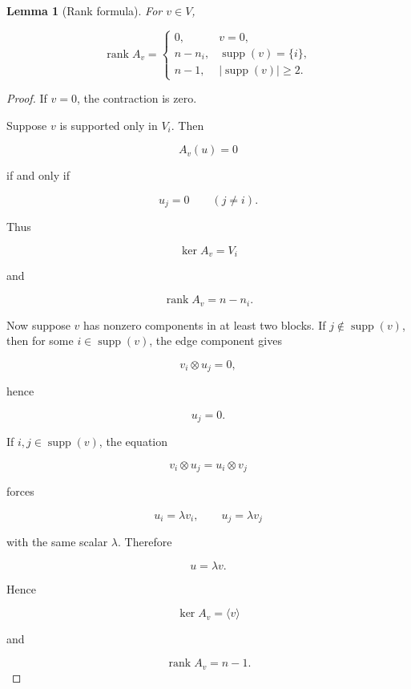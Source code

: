 \documentclass[11pt]{article}
\newtheorem{lemma}[theorem]{Lemma}
\begin{document}
\begin{lemma}[Rank formula]

For $v\in V$,

\[
\operatorname{rank}A_v=
\begin{cases}
0,&v=0,\\
n-n_i,&\operatorname{supp}(v)=\{i\},\\
n-1,&|\operatorname{supp}(v)|\ge2.
\end{cases}
\]

\end{lemma}
\begin{proof}

If $v=0$, the contraction is zero.

Suppose $v$ is supported only in $V_i$. Then

\[
A_v(u)=0
\]

if and only if

\[
u_j=0
\qquad
(j\ne i).
\]

Thus

\[
\ker A_v=V_i
\]

and

\[
\operatorname{rank}A_v=n-n_i.
\]

Now suppose $v$ has nonzero components in at least two blocks. If $j\notin\operatorname{supp}(v)$, then for some $i\in\operatorname{supp}(v)$, the edge component gives

\[
v_i\otimes u_j=0,
\]

hence

\[
u_j=0.
\]

If $i,j\in\operatorname{supp}(v)$, the equation

\[
v_i\otimes u_j=u_i\otimes v_j
\]

forces

\[
u_i=\lambda v_i,
\qquad
u_j=\lambda v_j
\]

with the same scalar $\lambda$. Therefore

\[
u=\lambda v.
\]

Hence

\[
\ker A_v=\langle v\rangle
\]

and

\[
\operatorname{rank}A_v=n-1.
\]

\end{proof}
\end{document}
